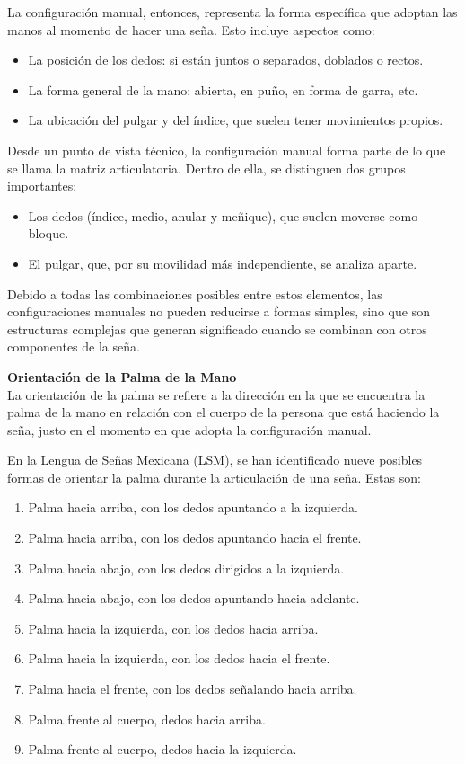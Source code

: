 La configuración manual, entonces, representa la forma específica que adoptan las manos al momento de hacer una seña. Esto incluye aspectos como:

\begin{itemize}
    \item La posición de los dedos: si están juntos o separados, doblados o rectos.
    \item La forma general de la mano: abierta, en puño, en forma de garra, etc.
    \item La ubicación del pulgar y del índice, que suelen tener movimientos propios.
\end{itemize}

Desde un punto de vista técnico, la configuración manual forma parte de lo que se llama la matriz articulatoria. Dentro de ella, se distinguen dos grupos importantes:

\begin{itemize}
    \item Los dedos (índice, medio, anular y meñique), que suelen moverse como bloque.
    \item El pulgar, que, por su movilidad más independiente, se analiza aparte.
\end{itemize}

Debido a todas las combinaciones posibles entre estos elementos, las configuraciones manuales no pueden reducirse a formas simples, sino que son estructuras complejas que generan significado cuando se combinan con otros componentes de la seña.

\newpage

\textbf{Orientación de la Palma de la Mano}\\
La orientación de la palma se refiere a la dirección en la que se encuentra la palma de la mano en relación con el cuerpo de la persona que está haciendo la seña, justo en el momento en que adopta la configuración manual.

En la Lengua de Señas Mexicana (LSM), se han identificado nueve posibles formas de orientar la palma durante la articulación de una seña. Estas son:

\begin{enumerate}
    \item Palma hacia arriba, con los dedos apuntando a la izquierda.
    \item Palma hacia arriba, con los dedos apuntando hacia el frente.
    \item Palma hacia abajo, con los dedos dirigidos a la izquierda.
    \item Palma hacia abajo, con los dedos apuntando hacia adelante.
    \item Palma hacia la izquierda, con los dedos hacia arriba.
    \item Palma hacia la izquierda, con los dedos hacia el frente.
    \item Palma hacia el frente, con los dedos señalando hacia arriba.
    \item Palma frente al cuerpo, dedos hacia arriba.
    \item Palma frente al cuerpo, dedos hacia la izquierda.
\end{enumerate}


